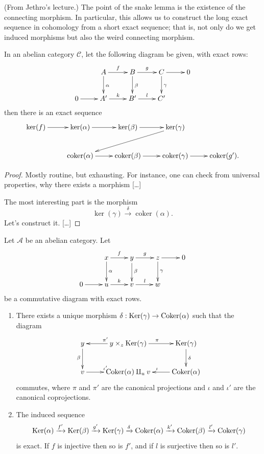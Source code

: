 \noindent
(From Jethro's lecture.)
The point of the snake lemma is the
existence of the connecting morphism.
In particular, this allows us to
construct the long exact sequence in
cohomology from a short exact sequence;
that is, not only do we get induced
morphisms but also the weird connecting
morphism.

\begin{lemma}
\label{lemma-snake-jethro}
In an abelian category $\mathcal{C}$,
let the following diagram be given,
with exact rows:
$$
\xymatrix{
& A \ar[r]^f \ar[d]^\alpha &
B \ar[r]^g \ar[d]^\beta &
C \ar[r] \ar[d]^\gamma &
0 \\
0 \ar[r] & A' \ar[r]^k & B' \ar[r]^l & C'
}
$$
then there is an exact sequence
$$
\xymatrix{
\ker(f)\ar[r]
&\ker(\alpha) \ar[r]
&\ker(\beta)\ar[r]
&\ker(\gamma)\ar[lld]\\
&\operatorname{coker}(\alpha)\ar[r]
&\operatorname{coker}(\beta)\ar[r]
&\operatorname{coker}(\gamma)\ar[r]
&\operatorname{coker}(g').
}
$$
\end{lemma}

\begin{proof}
Mostly routine, but exhausting.
For instance, one can check from
universal properties, why there
exists a morphism […]

The most interesting part is the 
morphism
$$
\ker(\gamma)\xrightarrow{\delta}
\operatorname{coker}(\alpha).
$$
Let's construct it. […]
\end{proof}

\begin{lemma}
\label{lemma-snake}
Let $\mathcal{A}$ be an abelian category. Let
$$
\xymatrix{
& x \ar[r]^f \ar[d]^\alpha &
y \ar[r]^g \ar[d]^\beta &
z \ar[r] \ar[d]^\gamma &
0 \\
0 \ar[r] & u \ar[r]^k & v \ar[r]^l & w
}
$$
be a commutative diagram with exact rows.
\begin{enumerate}
\item There exists a unique morphism
$\delta : \mathop{\mathrm{Ker}}(\gamma) \to \mathop{\mathrm{Coker}}(\alpha)$
such that the diagram
$$
\xymatrix{
y \ar[d]_\beta &
y \times_z \Ker(\gamma) \ar[l]_{\pi'}
\ar[r]^{\pi} &
\Ker(\gamma) \ar[d]^\delta \\
v \ar[r]^{\iota'} & \Coker(\alpha) \amalg_u v
&
\Coker(\alpha) \ar[l]_\iota
}
$$
commutes, where $\pi$ and $\pi'$ are the
canonical projections
and $\iota$ and $\iota'$ are the canonical
coprojections.
\item The induced sequence
$$
\mathop{\mathrm{Ker}}(\alpha) \xrightarrow{f'} \mathop{\mathrm{Ker}}(\beta)
\xrightarrow{g'}
\mathop{\mathrm{Ker}}(\gamma) \xrightarrow{\delta}
\mathop{\mathrm{Coker}}(\alpha) \xrightarrow{k'}
\mathop{\mathrm{Coker}}(\beta) \xrightarrow{l'} \mathop{\mathrm{Coker}}(\gamma)
$$
is exact. If $f$ is injective then so is
$f'$, and if $l$ is
surjective then so is $l'$.
\end{enumerate}
\end{lemma}

